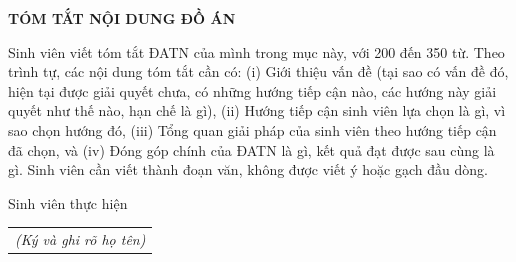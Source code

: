 \documentclass[../DoAn.tex]{subfiles}
\begin{document}
\begin{center}
    \Large{\textbf{TÓM TẮT NỘI DUNG ĐỒ ÁN}}\\
\end{center}
\vspace{1cm}
Sinh viên viết tóm tắt ĐATN của mình trong mục này, với 200 đến 350 từ. Theo trình tự, các nội dung tóm tắt cần có: (i) Giới thiệu vấn đề (tại sao có vấn đề đó, hiện tại được giải quyết chưa, có những hướng tiếp cận nào, các hướng này giải quyết như thế nào, hạn chế là gì), (ii) Hướng tiếp cận sinh viên lựa chọn là gì, vì sao chọn hướng đó, (iii) Tổng quan giải pháp của sinh viên theo hướng tiếp cận đã chọn, và (iv) Đóng góp chính của ĐATN là gì, kết quả đạt được sau cùng là gì. Sinh viên cần viết thành đoạn văn, không được viết ý hoặc gạch đầu dòng.

\begin{flushright}
Sinh viên thực hiện\\
\begin{tabular}{@{}c@{}}
\textit{(Ký và ghi rõ họ tên)}
\end{tabular}
\end{flushright}
\end{document}
